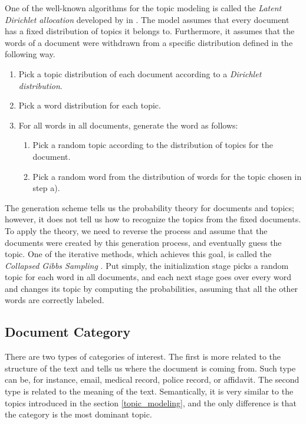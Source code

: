 \documentclass[
  digital, %
  notable,   %
  nolof,     %
  nolot,     %
]{fithesis3}
\begin{document}
One of the well-known algorithms for the topic modeling is called the \textit{Latent Dirichlet allocation} developed by \citeauthor{blei2003latent} in \citeyear{blei2003latent} \cite{blei2003latent}.
The model assumes that every document has a fixed distribution of topics it belongs to.
Furthermore, it assumes that the words of a document were withdrawn from a specific distribution defined in the following way.
\begin{enumerate}
\item Pick a topic distribution of each document according to a \textit{Dirichlet distribution}.
\item Pick a word distribution for each topic.
\item For all words in all documents, generate the word as follows:
\begin{enumerate}
  \item Pick a random topic according to the distribution of topics for the document.
  \item Pick a random word from the distribution of words for the topic chosen in step a).
\end{enumerate}
\end{enumerate}
The generation scheme tells us the probability theory for documents and topics; however, it does not tell us how to recognize the topics from the fixed documents.
To apply the theory, we need to reverse the process and assume that the documents were created by this generation process, and eventually guess the topic.
One of the iterative methods, which achieves this goal, is called the \textit{Collapsed Gibbs Sampling} \cite{xiao2010efficient}.
Put simply, the initialization stage picks a random topic for each word in all documents, and each next stage goes over every word and changes its topic by computing the probabilities, assuming that all the other words are correctly labeled.

\subsection{Document Category}
There are two types of categories of interest.
The first is more related to the structure of the text and tells us where the document is coming from. 
Such type can be, for instance, email, medical record, police record, or affidavit.
The second type is related to the meaning of the text.
Semantically, it is very similar to the topics introduced in the section \ref{topic_modeling}, and the only difference is that the category is the most dominant topic.
\end{document}
